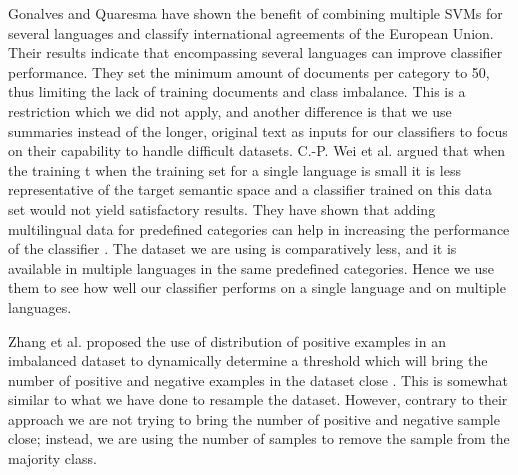 Gonalves and Quaresma \cite{gonalves2010} have shown the benefit of combining multiple \glspl{SVM} for several languages and classify international agreements of the European Union. Their results indicate that encompassing several languages can improve classifier performance. They set the minimum amount of documents per category to 50, thus limiting the lack of training documents and class imbalance. This is a restriction which we did not apply, and another difference is that we use summaries instead of the longer, original text as inputs for our classifiers to focus on their capability to handle difficult datasets. C.-P. Wei et al. argued that when the training t when the training set for a single language is small it is less representative of the target semantic space and a classifier trained on this data set would not yield satisfactory results. They have shown that adding multilingual data for predefined categories can help in increasing the performance of the classifier \cite{Wei:2014:EPD:2566999.2567111}. The dataset we are using is comparatively less, and it is available in multiple languages in the same predefined categories. Hence we use them to see how well our classifier performs on a single language and on multiple languages.

Zhang et al. proposed the use of distribution of positive examples in an imbalanced dataset to dynamically determine a threshold which will bring the number of positive and negative examples in the dataset close \cite{Zhang2013ImbalancedMN}. This is somewhat similar to what we have done to resample the dataset. However, contrary to their approach we are not trying to bring the number of positive and negative sample close; instead, we are using the number of samples to remove the sample from the majority class. 
